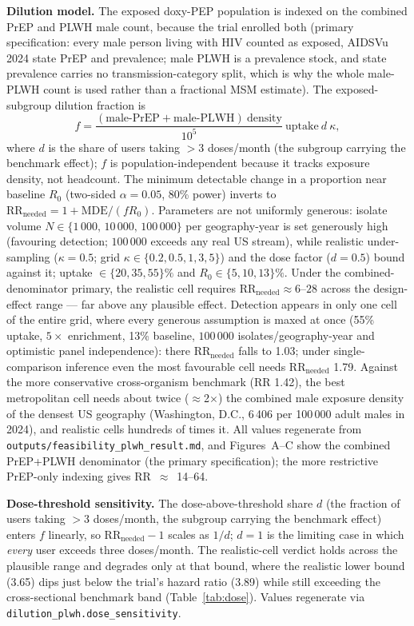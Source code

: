 \documentclass[11pt,a4paper]{article}
\begin{document}
\textbf{Dilution model.} The exposed doxy-PEP population is indexed on the
combined PrEP and PLWH male count, because the trial enrolled both (primary
specification: every male person living with HIV counted as exposed, AIDSVu 2024
state PrEP and prevalence; male PLWH is a prevalence stock, and state prevalence
carries no transmission-category split, which is why the whole male-PLWH count is
used rather than a fractional MSM estimate). The exposed-subgroup dilution
fraction is
\[f=\frac{(\text{male-PrEP}+\text{male-PLWH})\ \text{density}}{10^{5}}\ \text{uptake}\ d\ \kappa,\]
where $d$ is the share of users taking $>$3 doses/month (the subgroup carrying the
benchmark effect); $f$ is population-independent because it tracks exposure
density, not headcount. The minimum detectable change in a proportion near
baseline $R_0$ (two-sided $\alpha=0.05$, 80\% power) inverts to
$\mathrm{RR_{needed}}=1+\mathrm{MDE}/(f R_0)$. Parameters are not uniformly
generous: isolate volume $N\in\{1\,000,\,10\,000,\,100\,000\}$ per geography-year
is set generously high (favouring detection; $100\,000$ exceeds any real US
stream), while realistic under-sampling ($\kappa=0.5$; grid
$\kappa\in\{0.2,0.5,1,3,5\}$) and the dose factor ($d=0.5$) bound against it;
uptake $\in\{20,35,55\}\%$ and $R_0\in\{5,10,13\}\%$. Under the combined-denominator
primary, the realistic cell requires $\mathrm{RR_{needed}}\approx6$--$28$ across
the design-effect range --- far above any plausible effect. Detection appears in
only one cell of the entire grid, where every generous assumption is maxed at once
(55\% uptake, $5\times$ enrichment, 13\% baseline, $100\,000$
isolates/geography-year and optimistic panel independence): there
$\mathrm{RR_{needed}}$ falls to 1.03; under single-comparison inference even the
most favourable cell needs $\mathrm{RR_{needed}}$ 1.79. Against the more
conservative cross-organism benchmark (RR 1.42), the best metropolitan cell needs
about twice ($\approx$2$\times$) the combined male exposure density of the densest
US geography (Washington, D.C., 6\,406 per 100\,000 adult males in 2024), and
realistic cells hundreds of times it. All values regenerate from
\texttt{outputs/feasibility\_plwh\_result.md}, and Figures~A--C show the combined
PrEP+PLWH denominator (the primary specification); the more restrictive PrEP-only
indexing gives RR~$\approx$~14--64.

\textbf{Dose-threshold sensitivity.} The dose-above-threshold share $d$ (the
fraction of users taking $>$3 doses/month, the subgroup carrying the benchmark
effect) enters $f$ linearly, so $\mathrm{RR_{needed}}-1$ scales as $1/d$; $d=1$ is
the limiting case in which \emph{every} user exceeds three doses/month. The
realistic-cell verdict holds across the plausible range and degrades only at that
bound, where the realistic lower bound (3.65) dips just below the trial's hazard
ratio (3.89) while still exceeding the cross-sectional benchmark band
(Table~\ref{tab:dose}). Values regenerate via
\texttt{dilution\_plwh.dose\_sensitivity}.
\end{document}
